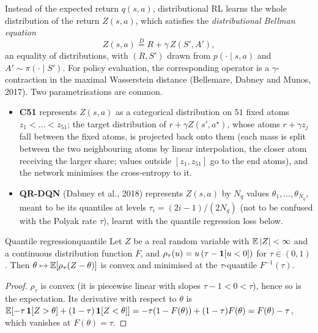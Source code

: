 Instead of the expected return $q(s, a)$, distributional RL learns the
whole distribution of the return $Z(s, a)$, which satisfies the
\emph{distributional Bellman equation}
\begin{equation}
  Z(s, a) \overset{D}{=} R + \gamma\, Z(S', A'),
\end{equation}
an equality of distributions, with $(R, S')$ drawn from $p(\cdot \mid s,
a)$ and $A' \sim \pi(\cdot \mid S')$. For policy evaluation, the
corresponding operator is a $\gamma$-contraction in the maximal
Wasserstein distance (Bellemare, Dabney and Munos, 2017). Two
parametrisations are common.
\begin{itemize}
  \item \textbf{C51} represents $Z(s, a)$ as a categorical distribution on
    $51$ fixed atoms $z_1 < \dots < z_{51}$; the target distribution of
    $r + \gamma Z(s', a^\star)$, whose atoms $r + \gamma z_j$ fall between
    the fixed atoms, is projected back onto them (each mass is split
    between the two neighbouring atoms by linear interpolation, the closer
    atom receiving the larger share; values outside $[z_1, z_{51}]$ go to
    the end atoms), and
    the network minimises the cross-entropy to it.
  \item \textbf{QR-DQN} (Dabney et al., 2018) represents $Z(s, a)$ by $N_q$
    values $\theta_1, \dots, \theta_{N_q}$, meant to be its quantiles at
    levels $\tau_i = (2i - 1) / (2N_q)$ (not to be confused with the Polyak
    rate $\tau$), learnt with the quantile regression loss
    below.
\end{itemize}

\begin{proposition}{Quantile regression}{quantile}
  Let $Z$ be a real random variable with $\mathbb{E}\left\lvert Z \right\rvert < \infty$ and a
  continuous distribution function $F$, and $\rho_\tau(u) = u \left( \tau -
  \mathbf{1}[u < 0] \right)$ for $\tau \in (0, 1)$. Then $\theta \mapsto
  \mathbb{E}[\rho_\tau(Z - \theta)]$ is
  convex and minimised at the $\tau$-quantile $F^{-1}(\tau)$.
\end{proposition}

\begin{proof}
  $\rho_\tau$ is convex (it is piecewise linear with slopes $\tau - 1 < 0 <
  \tau$), hence so is the expectation. Its derivative with respect to
  $\theta$ is $\mathbb{E}[-\tau\, \mathbf{1}[Z > \theta] + (1 - \tau)\,
  \mathbf{1}[Z < \theta]] = -\tau (1 - F(\theta)) + (1 - \tau) F(\theta) =
  F(\theta) - \tau$, which vanishes at $F(\theta) = \tau$.
\end{proof}

